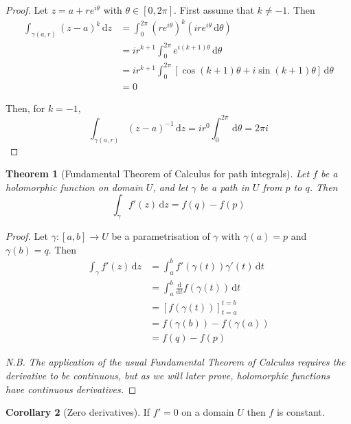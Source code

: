\documentclass[10pt,fleqn]{article}
\newcommand{\diff}{\,\mathrm{d}}
\theoremstyle{definition} \newtheorem{defn}{Definition}[section]
\theoremstyle{plain}      \newtheorem{thm}[defn]{Theorem}
\theoremstyle{definition} \newtheorem{prop}[defn]{Proposition}
\theoremstyle{plain}      \newtheorem{lem}[defn]{Lemma}
\theoremstyle{definition} \newtheorem{cor}[defn]{Corollary}
\theoremstyle{definition} \newtheorem{ex}[defn]{Example}
\theoremstyle{definition} \newtheorem{rem}[defn]{Remark}
\begin{document}
\begin{proof}
    Let $z=a+re^{i\theta}$ with $\theta\in[0,2\pi]$.
    First assume that $k\neq-1$.
    Then
    \begin{align*}
        \int_{\gamma(a,r)} (z-a)^k\diff z
        &=
        \int_0^{2\pi} \left(re^{i\theta}\right)^k\left(ire^{i\theta}\diff\theta\right)\\
        &=
        ir^{k+1}\int_0^{2\pi} e^{i(k+1)\theta}\diff\theta\\
        &=
        ir^{k+1}\int_0^{2\pi} [\cos(k+1)\theta+i\sin(k+1)\theta]\diff\theta\\
        &=0
    \end{align*}

    Then, for $k=-1$,
    \[
        \int_{\gamma(a,r)} (z-a)^{-1}\diff z=
        ir^0\int_0^{2\pi}\diff\theta=
        2\pi i
    \]
\end{proof}

\begin{thm}[Fundamental Theorem of Calculus for path integrals]
    Let $f$ be a holomorphic function on domain $U$, and let $\gamma$ be a path in $U$ from $p$ to $q$.
    Then
    \begin{equation}
        \int_{\gamma} f'(z)\diff z=
        f(q)-f(p)
    \end{equation}
\end{thm}

\begin{proof}
    Let $\gamma:[a,b]\to U$ be a parametrisation of $\gamma$ with $\gamma(a)=p$ and $\gamma(b)=q$.
    Then
    \begin{align*}
        \int_{\gamma} f'(z)\diff z
        &=
        \int_a^b f'(\gamma(t))\gamma'(t)\diff t\\
        &=
        \int_a^b \frac{\mathrm{d}}{\mathrm{d}t} f(\gamma(t))\diff t\\
        &=
        [f(\gamma(t))]_{t=a}^{t=b}\\
        &=
        f(\gamma(b))-f(\gamma(a))\\
        &=
        f(q)-f(p)
    \end{align*}

    \emph{N.B. The application of the usual Fundamental Theorem of Calculus requires the derivative to be continuous, but as we will later prove, holomorphic functions have continuous derivatives.}
\end{proof}

\begin{cor}[Zero derivatives]
    If $f'=0$ on a domain $U$ then $f$ is constant.
\end{cor}
\end{document}

